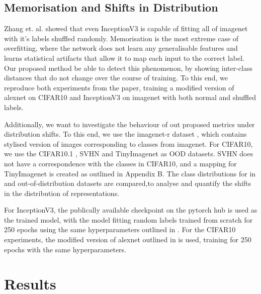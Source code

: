 \documentclass{article}
\begin{document}
        \subsection{Memorisation and Shifts in Distribution}
            Zhang et. al. \cite{zhang2017understandingdeeplearningrequires} showed that even InceptionV3 is capable of fitting all of imagenet \cite{russakovsky2015imagenetlargescalevisual} with it's labels shuffled randomly. Memorisation is the most extreme case of overfitting, where the network does not learn any generalisable features and learns statistical artifacts that allow it to map each input to the correct label. Our proposed method be able to detect this phenomenon, by showing inter-class distances that do not change over the course of training. To this end, we reproduce both experiments from the paper, training a modified version of alexnet on CIFAR10 and InceptionV3 on imagenet with both normal and shuffled labels.

            Additionally, we want to investigate the behaviour of out proposed metrics under distribution shifts. To this end, we use the imagenet-r dataset \cite{hendrycks2021facesrobustnesscriticalanalysis}, which contains stylised version of images corresponding to classes from imagenet. For CIFAR10, we use the CIFAR10.1 \cite{recht2018cifar10classifiersgeneralizecifar10}, SVHN and TinyImagenet as OOD datasets. SVHN does not have a correspondence with the classes in CIFAR10, and a mapping for TinyImagenet is created as outlined in Appendix B. The class distributions for in and out-of-distribution datasets are compared,to analyse and quantify the shifts in the distribution of representations.

            For InceptionV3, the publically available checkpoint on the pytorch hub is used as the trained model, with the model fitting random labels trained from scratch for 250 epochs using the same hyperparameters outlined in \cite{szegedy2015rethinkinginceptionarchitecturecomputer}. For the CIFAR10 experiments, the modified version of alexnet outlined in \cite{zhang2017understandingdeeplearningrequires} is used, training for 250 epochs with the same hyperparameters.
    \section{Results}
        
\end{document}
